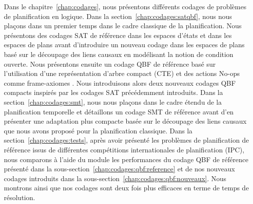 Dans le chapitre~\ref{chap:codages}, nous présentons différents codages de problèmes de planification en logique. Dans la section~\ref{chap:codages:satqbf}, nous nous plaçons dans un premier temps dans le cadre classique de la planification. Nous présentons des codages SAT de référence dans les espaces d'états \cite{KS92,KS95} et dans les espaces de plans \cite{MK99} avant d'introduire un nouveau codage dans les espaces de plans basé sur le découpage des liens causaux en modélisant la notion de condition ouverte. Nous présentons ensuite un codage QBF de référence basé sur l'utilisation d'une représentation d'arbre compact (CTE) et des actions No-ops comme frame-axiomes \cite{DBLP:conf/ecai/CashmoreFG12,DBLP:phd/ethos/Cashmore13}. Nous introduisons alors deux nouveaux codages QBF compacts inspirés par les codages SAT précédemment introduits. Dans la section~\ref{chap:codages:smt}, nous nous plaçons dans le cadre étendu de la planification temporelle et détaillons un codage SMT de référence \cite{DBLP:conf/ictai/MarisR08} avant d'en présenter une adaptation plus compacte basée sur le découpage des liens causaux que nous avons proposé pour la planification classique.
Dans la section~\ref{chap:codages:tests}, après avoir présenté les problèmes de planification de référence issus de différentes compétitions internationales de planification (IPC), nous comparons à l'aide du module \touistplan les performances du codage QBF de référence présenté dans la sous-section~\ref{chap:codages:qbf:reference} et de nos nouveaux codages introduits dans la sous-section~\ref{chap:codages:qbf:nouveaux}.
Nous montrons ainsi que nos codages sont deux fois plus efficaces en terme de temps de résolution.



